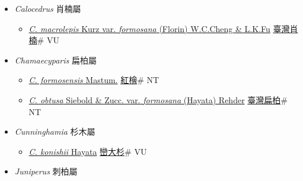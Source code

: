 
  \begin{itemize}
 \item[] \textit{Calocedrus} 肖楠屬
                    
  \begin{itemize}
        \item[] \href{http://www.theplantlist.org/tpl1.1/search?q=Calocedrus+macrolepis+var.+formosana}{\textit{C. macrolepis} Kurz var. \textit{formosana} (Florin) W.C.Cheng \& L.K.Fu}   \href{\detokenize{http://taibnet.sinica.edu.tw/chi/taibnet_species_list.php?T2=臺灣肖楠&T2_new_value=true&fr=y}}{臺灣肖楠}\# VU
  \end{itemize}
 \item[] \textit{Chamaecyparis} 扁柏屬
                    
  \begin{itemize}
        \item[] \href{http://www.theplantlist.org/tpl1.1/search?q=Chamaecyparis+formosensis}{\textit{C. formosensis} Mastum.}   \href{\detokenize{http://taibnet.sinica.edu.tw/chi/taibnet_species_list.php?T2=紅檜&T2_new_value=true&fr=y}}{紅檜}\# NT
        \item[] \href{http://www.theplantlist.org/tpl1.1/search?q=Chamaecyparis+obtusa+var.+formosana}{\textit{C. obtusa} Siebold \& Zucc. var. \textit{formosana} (Hayata) Rehder}   \href{\detokenize{http://taibnet.sinica.edu.tw/chi/taibnet_species_list.php?T2=臺灣扁柏&T2_new_value=true&fr=y}}{臺灣扁柏}\# NT
  \end{itemize}
 \item[] \textit{Cunninghamia} 杉木屬
                    
  \begin{itemize}
        \item[] \href{http://www.theplantlist.org/tpl1.1/search?q=Cunninghamia+konishii}{\textit{C. konishii} Hayata}   \href{\detokenize{http://taibnet.sinica.edu.tw/chi/taibnet_species_list.php?T2=巒大杉&T2_new_value=true&fr=y}}{巒大杉}\# VU
  \end{itemize}
 \item[] \textit{Juniperus} 刺柏屬
                    

\end{itemize}
